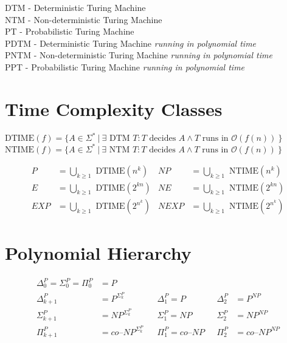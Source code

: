 \documentclass[
    13pt,
    oneside,
    a4paper,
    numbers=enddot,
    abstractoff,
    parskip=full
]{scrreprt}
\begin{document}
DTM - Deterministic Turing Machine\\
NTM - Non-deterministic Turing Machine\\
PT - Probabilistic Turing Machine\\
PDTM - Deterministic Turing Machine \textit{running in polynomial time}\\
PNTM - Non-deterministic Turing Machine \textit{running in polynomial time}\\
PPT - Probabilistic Turing Machine \textit{running in polynomial time}\\




\section*{Time Complexity Classes}
\label{sec:time_complexity_classes}

$\text{DTIME}(f) = \{
    A \in \Sigma^\ast ~|~
    \exists \text{ DTM } T:
    T \text{ decides } A \land
    T \text{ runs in } \mathcal{O}(f(n))
~\}$
$\text{NTIME}(f) = \{
    A \in \Sigma^\ast ~|~
    \exists \text{ NTM } T:
    T \text{ decides } A \land
    T \text{ runs in } \mathcal{O}(f(n))
~\}$


\begin{align*}
        P       &= \bigcup_{k \geq 1} \text{ DTIME}(n^k)
    &   NP      &= \bigcup_{k \geq 1} \text{ NTIME}(n^k)
    \\
        E       &= \bigcup_{k \geq 1} \text{ DTIME}(2^{kn})
    &   NE      &= \bigcup_{k \geq 1} \text{ NTIME}(2^{kn})
    \\
        EXP     &= \bigcup_{k \geq 1} \text{ DTIME}(2^{n^k})
    &   NEXP    &= \bigcup_{k \geq 1} \text{ NTIME}(2^{n^k})
\end{align*}




\section*{Polynomial Hierarchy}
\label{sec:polynomial_hierarchy}


\begin{align*}
    \Delta^P_0 = \Sigma^P_0 = \Pi^P_0 &= P
    \\
        \Delta^P_{k+1} &= P^{\Sigma^P_k}
    &&  \Delta^P_1 = P ~~~& \Delta^P_2 &= P^{NP}
    \\
        \Sigma^P_{k+1} &= NP^{\Sigma^P_k}
    &&  \Sigma^P_1 = NP ~~~& \Sigma^P_2 &= NP^{NP}
    \\
        \Pi^P_{k+1} &= co\text{--}NP^{\Sigma^P_k}
    &&  \Pi^P_1 = co\text{--}NP ~~~& \Pi^P_2 &= co\text{--}NP^{NP}
\end{align*}
\end{document}
